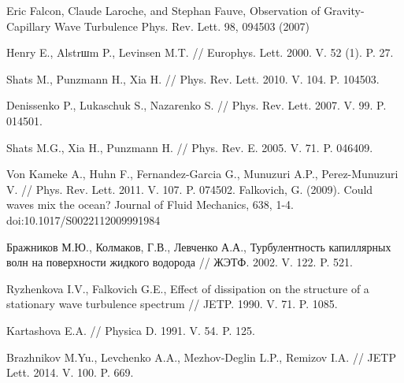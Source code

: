 \begin{thebibliography}{99}
Eric Falcon, Claude Laroche, and Stephan Fauve, Observation of Gravity-Capillary Wave Turbulence
Phys. Rev. Lett. 98, 094503 (2007)

Henry E., Alstrшm P., Levinsen M.T. // Europhys. Lett. 2000. V. 52 (1). P. 27.

Shats M., Punzmann H., Xia H. // Phys. Rev. Lett. 2010. V. 104. P. 104503.

Denissenko P., Lukaschuk S., Nazarenko S. // Phys. Rev. Lett. 2007. V. 99. P. 014501.

Shats M.G., Xia H., Punzmann H. // Phys. Rev. E. 2005. V. 71. P. 046409.

Von Kameke A., Huhn F., Fernandez-Garcia G., Munuzuri A.P., Perez-Munuzuri V. // Phys. Rev. Lett. 2011. V. 107. P. 074502.
Falkovich, G. (2009). Could waves mix the ocean? Journal of Fluid Mechanics, 638, 1-4. doi:10.1017/S0022112009991984


Бражников М.Ю., Колмаков, Г.В., Левченко А.А., Турбулентность капиллярных волн на поверхности жидкого водорода // ЖЭТФ. 2002. V. 122. P. 521.

Ryzhenkova I.V., Falkovich G.E., Effect of dissipation on the structure of a stationary wave turbulence spectrum // JETP. 1990. V. 71. P. 1085.



Kartashova E.A. // Physica D. 1991. V. 54. P. 125.

Brazhnikov M.Yu., Levchenko A.A., Mezhov-Deglin L.P., Remizov I.A. // JETP Lett. 2014. V. 100. P. 669.


\end{thebibliography}

